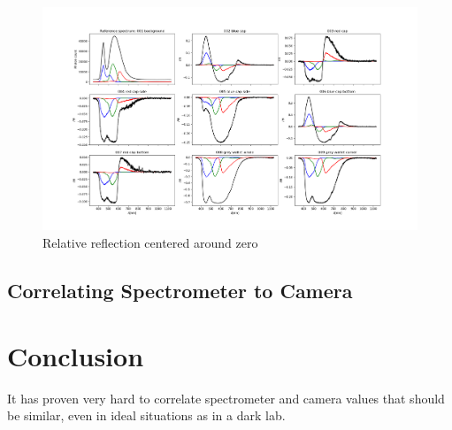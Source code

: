 \documentclass{article}
\begin{document}
\begin{landscape}
\begin{figure}[t]
    \centering
    \includegraphics[width=1\paperwidth]{Plots/relative_reflectance_around_zero_with_qe_color_response.png}
    \caption{Relative reflection centered around zero}
    \label{fig:relative_reflection_around_zero}
\end{figure}
\end{landscape}


\subsection{Correlating Spectrometer to Camera}


\section{Conclusion}

It has proven very hard to correlate spectrometer and camera values that should be similar, even in ideal situations as in a dark lab.



\end{document}
